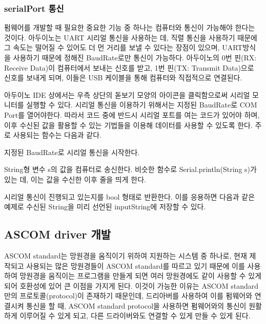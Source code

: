 \subsubsection{serialPort 통신}
펌웨어를 개발할 때 필요한 중요한 기능 중 하나는 컴퓨터와 통신이 가능해야 한다는 것이다. 아두이노는 UART 시리얼 통신을 사용하는 데, 직렬 통신을 사용하기 때문에 그 속도는 떨어질 수 있어도 더 먼 거리를 보낼 수 있다는 장점이 있으며, UART방식을 사용하기 때문에 정해진 BaudRate로만 통신이 가능하다. 아두이노의 0번 핀(RX: Receive Data)이 컴퓨터에서 보내는 신호를 받고, 1번 핀(TX: Transmit Data)으로 신호를 보내게 되며, 이들은 USB 케이블을 통해 컴퓨터와 직접적으로 연결된다.

아두이노 IDE 상에서는 우측 상단의 돋보기 모양의 아이콘을 클릭함으로써 시리얼 모니터를 실행할 수 있다. 시리얼 통신을 이용하기 위해서는 지정된 BaudRate로 COM Port를 열어야한다. 따라서 코드 중에 반드시 시리얼 포트를 여는 코드가 있어야 하며, 이후 수신된 값을 활용할 수 있는 기법들을 이용해 데이터를 사용할 수 있도록 한다. 주로 사용되는 함수는 다음과 같다.

\begin{description}[font=$\bullet$~\normalfont\scshape\color{red!50!black}]
	\item [Serial.begin(int BaudRate)] 지정된 BaudRate로 시리얼 통신을 시작한다.
	\item [Serial.print(String s)] String형 변수 s의 값을 컴퓨터로 송신한다. 비슷한 함수로 Serial.println(String s)가 있는 데, 이는 값을 수신한 이후 줄을 띄게 한다.
	\item [Serial.available()] 시리얼 통신이 진행되고 있는지를 bool 형태로 반환한다. 이를 응용하면 다음과 같은 예제로 수신된 String을 미리 선언된 inputString에 저장할 수 있다.
\end{description}


\subsection{ASCOM driver 개발}

ASCOM standard는 망원경을 움직이기 위하여 지원하는 시스템 중 하나로, 현재 제작되고 사용되는 많은 망원경들이 ASCOM standard를 따르고 있기 때문에 이를 사용하여 망원경을 움직이는 프로그램을 만들게 되면 여러 망원경에도 같이 사용할 수 있게 되어 호환성에 있어 큰 이점을 가지게 된다. 이것이 가능한 이유는 ASCOM standard 만의 프로토콜(protocol)이 존재하기 때문인데, 드리아버를 사용하여 이를 펌웨어와 연결시켜 통신을 할 때, ASCOM standard protocol을 사용하면 펌웨어와의 통신이 원활하게 이루어질 수 있게 되고, 다른 드라이버와도 연결할 수 있게 만들 수 있게 된다.

